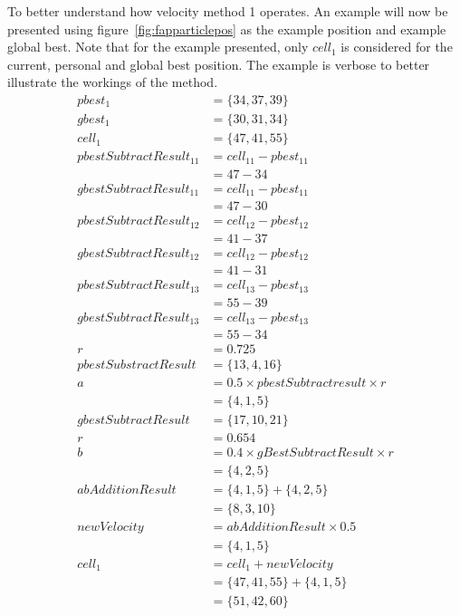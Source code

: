 To better understand how velocity method 1 operates. An example will now be presented using figure~\ref{fig:fapparticlepos} as the example position and example global best. Note that for the example presented, only $cell_1$ is considered for the current, personal and global best position. The example is verbose to better illustrate the workings of the method.
\begin{align}
    pbest_1 &= \{34,37,39\} \nonumber \\
    gbest_1 &= \{30,31,34\} \nonumber \\
    cell_1 &= \{47,41,55\} \nonumber \\
    pbestSubtractResult_{11} &= cell_{11} - pbest_{11} \nonumber \\
                        &= 47 - 34 \nonumber \\
    gbestSubtractResult_{11} &= cell_{11} - pbest_{11} \nonumber \\
                        &= 47 - 30 \nonumber \\
    pbestSubtractResult_{12} &= cell_{12} - pbest_{12} \nonumber \\
                        &= 41 - 37 \nonumber \\
    gbestSubtractResult_{12} &= cell_{12} - pbest_{12} \nonumber \\
                        &= 41 - 31 \nonumber \\
    pbestSubtractResult_{13} &= cell_{13} - pbest_{13} \nonumber \\
                        &= 55 - 39 \nonumber \\
    gbestSubtractResult_{13} &= cell_{13} - pbest_{13} \nonumber \\
                        &= 55 - 34 \nonumber \\
    r &= 0.725 \nonumber \\
    pbestSubstractResult &= \{13,4,16\} \nonumber \\
    a &= 0.5 \times pbestSubtractresult \times r \nonumber \\
    &= \{4, 1, 5\} \nonumber \\
    gbestSubtractResult &= \{17,10,21\} \nonumber \\
    r &= 0.654 \nonumber \\
    b &= 0.4 \times gBestSubtractResult \times r \nonumber \\
    &= \{4,2,5\} \nonumber \\
    abAdditionResult &= \{4,1,5\} + \{4,2,5\}  \nonumber \\
                    &= \{8,3,10\} \nonumber \\
    newVelocity &= abAdditionResult \times 0.5 \nonumber \\
    &= \{4,1,5\} \nonumber \\
    cell_1 &= cell_1 + newVelocity \nonumber \\
    &= \{47,41,55\} + \{4,1,5\} \nonumber \\
    &= \{51, 42, 60\} \nonumber \\
\end{align}

